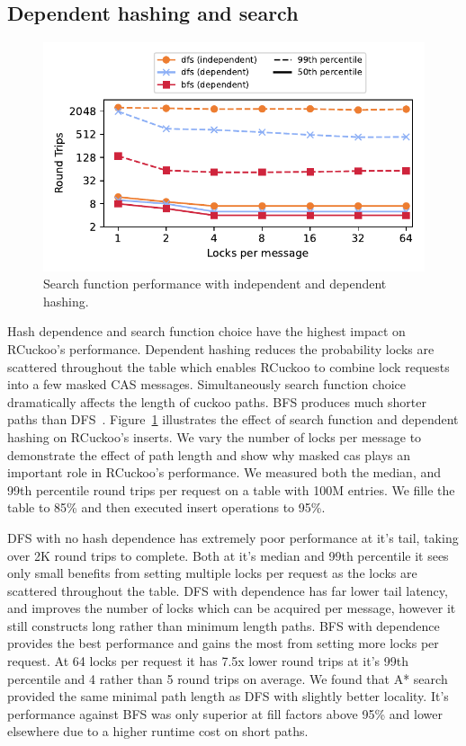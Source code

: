 \subsection{Dependent hashing and search}

\begin{figure}[ht]
    \includegraphics[width=0.99\linewidth]{fig/search_dependence.pdf}

    \caption{ Search function performance with independent
    and dependent hashing.}

    \label{fig:search_dependence}
\end{figure}

Hash dependence and search function choice have the highest
impact on RCuckoo's performance. Dependent hashing reduces
the probability locks are scattered throughout the table
which enables RCuckoo to combine lock requests into a few
masked CAS messages. Simultaneously search function choice
dramatically affects the length of cuckoo paths. BFS
produces much shorter paths than
DFS~\cite{cuckoo-improvements,pilaf,cuckoo}.
Figure~\ref{fig:search_dependence} illustrates the effect of
search function and dependent hashing on RCuckoo's inserts.
We vary the number of locks per message to demonstrate the
effect of path length and show why masked cas plays an
important role in RCuckoo's performance. We measured both
the median, and 99th percentile round trips per request on a
table with 100M entries. We fille the table to 85\% and then
executed insert operations to 95\%.

DFS with no hash dependence has extremely poor performance
at it's tail, taking over 2K round trips to complete. Both
at it's median and 99th percentile it sees only small
benefits from setting multiple locks per request as the
locks are scattered throughout the table. DFS with
dependence has far lower tail latency, and improves the
number of locks which can be acquired per message, however
it still constructs long rather than minimum length paths.
BFS with dependence provides the best performance and gains
the most from setting more locks per request. At 64 locks
per request it has 7.5x lower round trips at it's 99th
percentile and 4 rather than 5 round trips on average. We
found that A* search provided the same minimal path length
as DFS with slightly better locality. It's performance
against BFS was only superior at fill factors above 95\% and
lower elsewhere due to a higher runtime cost on short paths.



